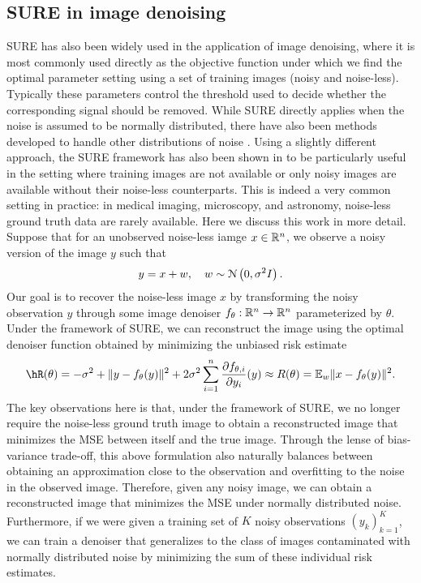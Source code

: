 \subsection{SURE in image denoising}
SURE has also been widely used in the application of image denoising, where it is most commonly used directly as the objective function under which we find the optimal parameter setting using a set of training images (noisy and noise-less). Typically these parameters control the threshold used to decide whether the corresponding signal should be removed. While SURE directly applies when the noise is assumed to be normally distributed, there have also been methods developed to handle other distributions of noise \citep{donoho1995adapting,luisier2010image,panisetti2014unbiased}. Using a slightly different approach, the SURE framework has also been shown in \citet{metzler2018unsupervised} to be particularly useful in the setting where training images are not available or only noisy images are available without their noise-less counterparts. This is indeed a very common setting in practice: in medical imaging, microscopy, and
astronomy, noise-less ground truth data are rarely available. Here we discuss this work in more detail. Suppose that for an unobserved noise-less iamge $x\in\mathbb{R}^n$, we observe a noisy version of the image $y$ such that
\[
y = x + w, \quad w\sim\mathcal{N}\left(0,\sigma^2I\right).
\]
Our goal is to recover the noise-less image $x$ by transforming the noisy observation $y$ through some image denoiser $f_\theta:\mathbb{R}^n\to\mathbb{R}^n$ parameterized by $\theta$. Under the framework of SURE, we can reconstruct the image using the optimal denoiser function obtained by minimizing the unbiased risk estimate
\[
\hR(\theta) = - \sigma^2 + \|y - f_\theta(y)\|^2 + 2\sigma^2\sum_{i=1}^n \frac{\partial f_{\theta,i}}{\partial y_i}(y) \approx R(\theta) = \EE_w \| x - f_\theta(y) \|^2.
\]
The key observations here is that, under the framework of SURE, we no longer require the noise-less ground truth image to obtain a reconstructed image that minimizes the MSE between itself and the true image. Through the lense of bias-variance trade-off, this above formulation also naturally balances between obtaining an approximation close to the observation and overfitting to the noise in the observed image. Therefore, given any noisy image, we can obtain a reconstructed image that minimizes the MSE under normally distributed noise. Furthermore, if we were given a training set of $K$ noisy observations $(y_k)_{k=1}^K$, we can train a denoiser that generalizes to the class of images contaminated with normally distributed noise by minimizing the sum of these individual risk estimates.

